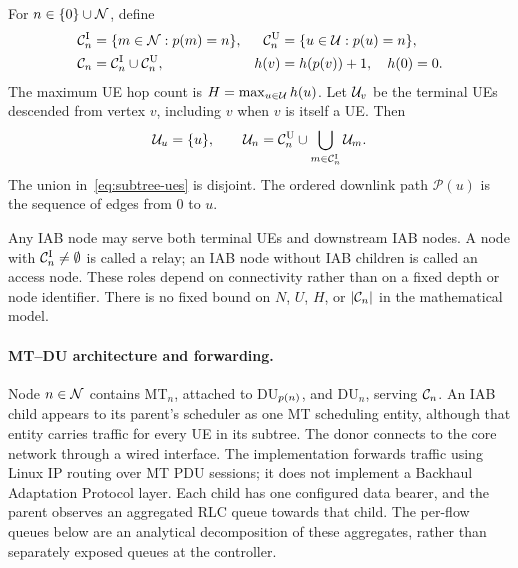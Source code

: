 \begin{EnChapter}
\begin{definition}
For $n\in\{0\}\cup\mathcal{N}$, define
\begin{align}
  \mathcal{C}_n^{\mathrm{I}}&=\{m\in\mathcal{N}:p(m)=n\}, &
  \mathcal{C}_n^{\mathrm{U}}&=\{u\in\mathcal{U}:p(u)=n\},\\
  \mathcal{C}_n&=\mathcal{C}_n^{\mathrm{I}}\cup\mathcal{C}_n^{\mathrm{U}}, &
  h(v)&=h(p(v))+1,\quad h(0)=0.
\end{align}
The maximum UE hop count is $H=\max_{u\in\mathcal{U}}h(u)$. Let $\mathcal{U}_v$ be the
terminal UEs descended from vertex $v$, including $v$ when $v$ is itself a UE.
Then
\begin{equation}
  \mathcal{U}_u=\{u\},\qquad
  \mathcal{U}_n=\mathcal{C}_n^{\mathrm{U}}\cup
           \bigcup_{m\in\mathcal{C}_n^{\mathrm{I}}}\mathcal{U}_m.
  \label{eq:subtree-ues}
\end{equation}
The union in~\eqref{eq:subtree-ues} is disjoint. The ordered downlink path
$\mathcal{P}(u)$ is the sequence of edges from $0$ to $u$.
\end{definition}

Any IAB node may serve both terminal UEs and downstream IAB nodes. A node with
$\mathcal{C}_n^{\mathrm{I}}\ne\emptyset$ is called a relay; an IAB node without IAB
children is called an access node. These roles depend on connectivity rather than
on a fixed depth or node identifier. There is no fixed bound on $N$, $U$, $H$, or
$|\mathcal{C}_n|$ in the mathematical model.

\paragraph{MT--DU architecture and forwarding.}
Node $n\in\mathcal{N}$ contains MT$_n$, attached to DU$_{p(n)}$, and DU$_n$,
serving $\mathcal{C}_n$. An IAB child appears to its parent's scheduler as one MT
scheduling entity, although that entity carries traffic for every UE in its
subtree. The donor connects to the core network through a wired interface.
The implementation forwards traffic using Linux IP routing over MT PDU sessions;
it does not implement a Backhaul Adaptation Protocol layer. Each child has one
configured data bearer, and the parent observes an aggregated RLC queue towards
that child. The per-flow queues below are an analytical decomposition of these
aggregates, rather than separately exposed queues at the controller.


\end{EnChapter}
